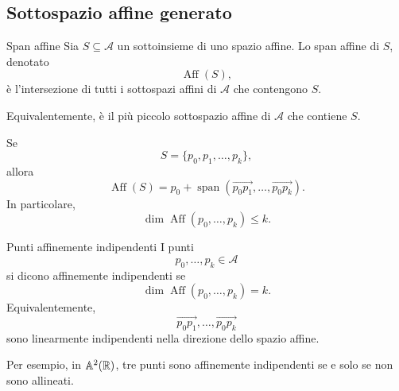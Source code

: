\documentclass[a4paper]{article}
\begin{document}
\subsection{Sottospazio affine generato}

\begin{snippetdefinition}{Span affine}
    Sia \(S\subseteq\mathcal{A}\) un sottoinsieme di uno spazio affine. Lo span affine di \(S\), denotato
    \[
        \operatorname{Aff}(S),
    \]
    è l'intersezione di tutti i sottospazi affini di \(\mathcal{A}\) che contengono \(S\).

    Equivalentemente, è il più piccolo sottospazio affine di \(\mathcal{A}\) che contiene \(S\).
\end{snippetdefinition}

Se
\[
    S=\{p_0,p_1,\ldots,p_k\},
\]
allora
\[
    \operatorname{Aff}(S)
    =
    p_0+
    \operatorname{span}
    \left(
        \overrightarrow{p_0p_1},
        \ldots,
        \overrightarrow{p_0p_k}
    \right).
\]
In particolare,
\[
    \dim\operatorname{Aff}(p_0,\ldots,p_k)\leq k.
\]

\begin{snippetdefinition}{Punti affinemente indipendenti}
    I punti
    \[
        p_0,\ldots,p_k\in\mathcal{A}
    \]
    si dicono affinemente indipendenti se
    \[
        \dim\operatorname{Aff}(p_0,\ldots,p_k)=k.
    \]
    Equivalentemente,
    \[
        \overrightarrow{p_0p_1},
        \ldots,
        \overrightarrow{p_0p_k}
    \]
    sono linearmente indipendenti nella direzione dello spazio affine.
\end{snippetdefinition}

Per esempio, in \(\mathbb{A}^2(\mathbb{R})\), tre punti sono affinemente indipendenti se e solo se non sono allineati.

\begin{center}
\end{center}
\end{document}
